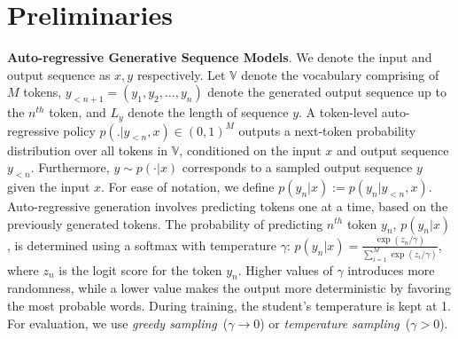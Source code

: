 \documentclass{article} %
\newcommand{\mfg}[1]{{\color{purple}[mfg: #1]}}
\begin{document}
\section{Preliminaries}
\vspace{-0.25cm}
\label{sec:back}
\textbf{Auto-regressive Generative Sequence Models}. We denote the input and output sequence as $x, y$ respectively. Let $\mathbb{V}$ denote the vocabulary comprising of $M$ tokens, $y_{<n+1} = (y_1, y_2, \dots, y_{n})$ denote the generated output sequence up to the $n^{th}$ token, and $L_y$ denote the length of sequence $y$. %
A token-level auto-regressive policy $p(. | y_{<n}, x) \in (0,1)^{M}$ outputs a next-token probability distribution over all tokens in $\mathbb{V}$, conditioned on the input $x$ and output sequence $y_{<n}$.  Furthermore, $y \sim p(\cdot|x)$ corresponds to a sampled output sequence $y$ given the input $x$. For ease of notation, we define $p(y_n|x) := p(y_n | y_{<n}, x)$. %
Auto-regressive generation involves predicting tokens one at a time, based on the previously generated tokens. The probability of predicting $n^{th}$ token $y_n$, $p(y_n|x)$, is determined using a softmax with temperature $\gamma$: $p(y_n|x) = \frac{\exp(z_{n}/\gamma)}{\sum_{i=1}^{M} \exp(z_i /\gamma)}$, where $z_n$
is the logit score for the token $y_n$. Higher values of $\gamma$ introduces more randomness, while a lower value makes the output more deterministic by favoring the most probable words. During training, the student's temperature is kept at 1. For evaluation, we use \emph{greedy sampling}~($\gamma \rightarrow 0$) or \emph{temperature sampling}~($\gamma > 0$).
\end{document}
